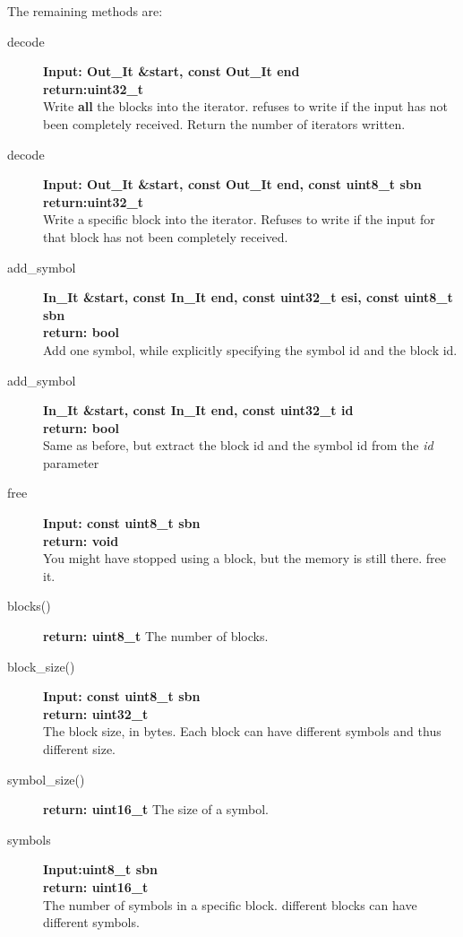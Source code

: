 \documentclass[11pt,a4paper]{refart}
\begin{document}
The remaining methods are:
\begin{description}
\item[decode]\textbf{Input: Out\_It \&start, const Out\_It end}\\
\textbf{return:uint32\_t}\\
Write \textbf{all} the blocks into the iterator. refuses to write if the input has not been completely received. Return the number of iterators written.

\item[decode]\textbf{Input: Out\_It \&start, const Out\_It end, const uint8\_t sbn}\\
\textbf{return:uint32\_t}\\
Write a specific block into the iterator. Refuses to write if the input for that block has not been completely received.

\item[add\_symbol]\textbf{In\_It \&start, const In\_It end, const uint32\_t esi, const uint8\_t sbn}\\
\textbf{return: bool}\\
Add one symbol, while explicitly specifying the symbol id and the block id.

\item[add\_symbol]\textbf{In\_It \&start, const In\_It end, const uint32\_t id}\\
\textbf{return: bool}\\
Same as before, but extract the block id and the symbol id from the \textit{id} parameter

\item[free]\textbf{Input: const uint8\_t sbn}\\
\textbf{return: void}\\
You might have stopped using a block, but the memory is still there. free it.

\item[blocks()] \textbf{return: uint8\_t} The number of blocks.

\item[block\_size()] \textbf{Input: const uint8\_t sbn}\\
\textbf{return: uint32\_t}\\
The block size, in bytes. Each block can have different symbols and thus different size.

\item[symbol\_size()] \textbf{return: uint16\_t} The size of a symbol.

\item[symbols] \textbf{Input:uint8\_t sbn}\\
\textbf{return: uint16\_t}\\
The number of symbols in a specific block. different blocks can have different symbols.
\end{description}
\end{document}

